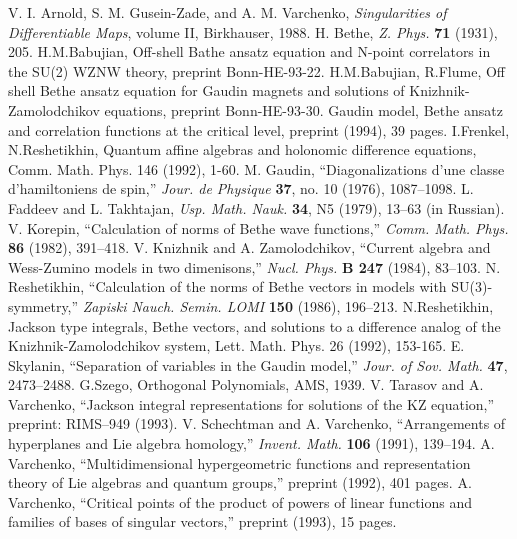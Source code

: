 \label{[AGV]} V. I. Arnold, S. M. Gusein-Zade, and A. M. Varchenko,
{\it Singularities of Differentiable Maps}, volume II, Birkhauser,
1988.
\label{[B]} H. Bethe, {\it Z. Phys.} {\bf 71} (1931), 205.
\label{[Ba]} H.M.Babujian, Off-shell Bathe ansatz equation and N-point
correlators in the SU(2) WZNW theory, preprint Bonn-HE-93-22.
\label{[BF]} H.M.Babujian, R.Flume, Off shell Bethe ansatz equation
for Gaudin magnets and solutions of Knizhnik-Zamolodchikov
equations, preprint Bonn-HE-93-30.
\label{[FFR]} Gaudin model, Bethe ansatz and correlation functions at the
critical level, preprint (1994), 39 pages.
\label{[FR]} I.Frenkel, N.Reshetikhin, Quantum affine algebras and
holonomic difference equations, Comm. Math. Phys. 146 (1992), 1-60.
\label{[G]} M. Gaudin, ``Diagonalizations d'une classe
d'hamiltoniens de spin,'' {\it Jour. de Physique} {\bf 37}, no. 10
(1976), 1087--1098.
\label{[FT]} L. Faddeev and L. Takhtajan, {\it Usp. Math. Nauk.} {\bf
34}, N5 (1979), 13--63 (in Russian).
\label{[K]} V. Korepin, ``Calculation of norms of Bethe wave
functions,'' {\it Comm. Math. Phys.} {\bf 86} (1982), 391--418.
\label{[KZ]} V. Knizhnik and A. Zamolodchikov, ``Current algebra and
Wess-Zumino models in two dimenisons,'' {\it Nucl. Phys.} {\bf B 247}
(1984), 83--103.
\label{[R1]} N. Reshetikhin, ``Calculation of the norms of Bethe
vectors in models with SU(3)-symmetry,'' {\it Zapiski Nauch. Semin.
LOMI} {\bf 150} (1986), 196--213.
\label{[R2]} N.Reshetikhin, Jackson type integrals, Bethe vectors, and
 solutions to a difference analog of the Knizhnik-Zamolodchikov system,
Lett. Math. Phys. 26 (1992), 153-165.
\label{[S]} E. Skylanin, ``Separation of variables in the Gaudin
model,'' {\it Jour. of Sov. Math.} {\bf 47}, 2473--2488.
\label{[Sz]} G.Szego, Orthogonal Polynomials, AMS, 1939.
\label{[TV]} V. Tarasov and A. Varchenko, ``Jackson integral
representations for solutions of the KZ equation,'' preprint:
RIMS--949 (1993).
\label{[SV]} V. Schechtman and A. Varchenko, ``Arrangements of
hyperplanes and Lie algebra homology,'' {\it Invent.  Math.} {\bf 106}
(1991), 139--194.
\label{[V1]} A. Varchenko, ``Multidimensional hypergeometric functions
and representation theory of Lie algebras and quantum groups,''
preprint (1992), 401 pages.
\label{[V2]} A. Varchenko, ``Critical points of the product of powers
of linear functions and families of bases of singular vectors,''
preprint (1993), 15 pages.

\enddocument









